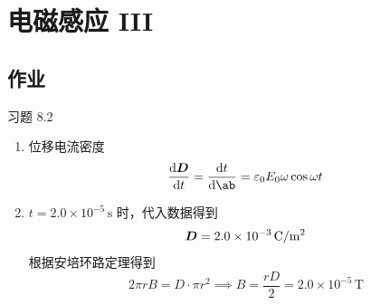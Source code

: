 \section{电磁感应 III}

\subsection{作业}

\begin{problem}
	习题 8.2
	\begin{solution}
		\begin{enumerate}
			\item[\textbf{1)}] 位移电流密度
			$$
			\dv{\vect{D}}{t} = \dv{t} \ab(\varepsilon_0 E_0 \sin \omega t) = \varepsilon_0 E_0 \omega \cos \omega t
			$$
			\item[\textbf{2)}] $t = 2.0 \times 10^{-5}\,\mathrm{s}$ 时，代入数据得到
			$$
			\boldsymbol{D} = 2.0 \times 10^{-3} \,\mathrm{C / m^2}
			$$
			根据安培环路定理得到
			$$
			2 \pi r B = D \cdot \pi r^2 \implies B = \frac{r D}{2} = 2.0 \times 10^{-5} \,\mathrm{T}
			$$
		\end{enumerate}
	\end{solution}
\end{problem}